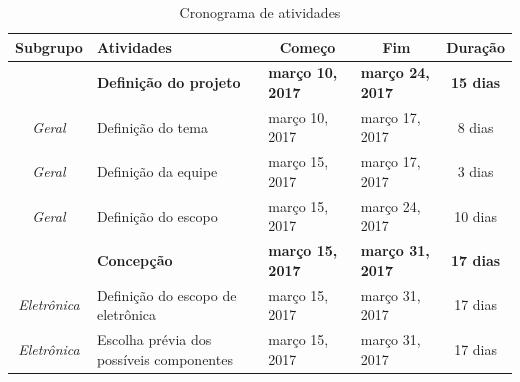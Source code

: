 \footnotesize  %
\setlength\LTleft{-40pt}            %
\setlength\LTright{\fill}           %
\begin{longtable}{|c|m{6.5cm}|m{3.2cm}|m{3.2cm}|c|}
\caption{Cronograma de atividades}
\label{tab:cronograma}
\endfirsthead
\endhead

\hline
\textbf{Subgrupo}                                                         & \textbf{Atividades}                                  & \multicolumn{1}{c|}{\textbf{Começo}} & \multicolumn{1}{c|}{\textbf{Fim}} & \multicolumn{1}{c|}{\textbf{Duração}} \\ \hline
                                                                          & \textbf{Definição do projeto}                        & \textbf{março 10, 2017}              & \textbf{março 24, 2017}           & \textbf{15 dias}                      \\ \hline
\textit{Geral}                                                            & Definição do tema                                    & março 10, 2017                       & março 17, 2017                    & 8 dias                                \\ \hline
\textit{Geral}                                                            & Definição da equipe                                  & março 15, 2017                       & março 17, 2017                    & 3 dias                                \\ \hline
\textit{Geral}                                                            & Definição do escopo                                  & março 15, 2017                       & março 24, 2017                    & 10 dias                               \\ \hline
                                                                          & \textbf{Concepção}                                   & \textbf{março 15, 2017}              & \textbf{março 31, 2017}           & \textbf{17 dias}                      \\ \hline
\textit{Eletrônica}                                                       & Definição do escopo de eletrônica                    & março 15, 2017                       & março 31, 2017                    & 17 dias                               \\ \hline
\textit{Eletrônica}                                                       & Escolha prévia dos possíveis componentes             & março 15, 2017                       & março 31, 2017                    & 17 dias                               \\ \hline

\end{longtable}

